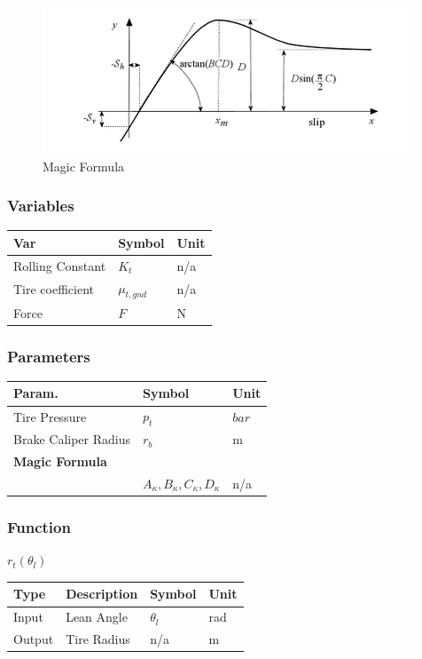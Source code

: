 \documentclass[../SimBALink.tex]{subfiles}
\begin{document}
 \begin{figure}[h!]
  \centering
  \includegraphics[scale=1]{magic_formula}
  \caption{Magic Formula }
\end{figure}

\subsubsection{Variables}
	\begin{tabular}{ l | l | l  }
		Var					&	Symbol		&	Unit		\\	\hline
		Rolling Constant	&	$K_t$		& 	n/a \\
		Tire coefficient 	& $\mu_{t,gnd}$ &	n/a \\
		Force 				&	$F$	&	N \\
	\end{tabular}
\subsubsection{Parameters}
	\begin{tabular}{ l | l | l  }
		Param.					&	Symbol		&	Unit		\\	\hline
		Tire Pressure		&	$p_t$		&	 $bar$ \\
		Brake Caliper Radius &	$r_b$		&	m \\		
		\textbf{Magic Formula}\\		&	$A_{\kappa},B_{\kappa},C_{\kappa},D_{\kappa}$		&	 n/a \\
	\end{tabular}
	
\subsubsection{Function}
$r_t(\theta_l)$ \\
	\begin{tabular}{ l | l | l | l }
		Type				& Description		&	Symbol		&	Unit		\\	\hline
		Input 				& Lean Angle		&	$\theta_l$  & 	rad		\\
		Output 				& Tire Radius		&	n/a			&	m
	\end{tabular} \\
\end{document}
